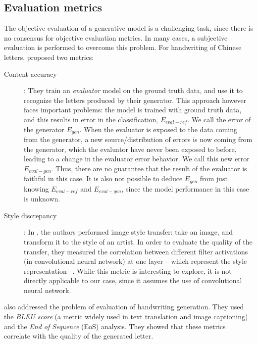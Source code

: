 \documentclass[conference]{IEEEtran}
\begin{document}
\subsection{Evaluation metrics}
\par The objective evaluation of a generative model is a challenging task, since there is no consensus for objective evaluation metrics. In many cases, a subjective evaluation is performed to overcome this problem. For handwriting of Chinese letters, \cite{DBLP:journals/corr/abs-1801-08624} proposed two metrics:
\begin{description}
    \item[Content accuracy] : They train an \textit{evaluator} model on the ground truth data, and use it to recognize the letters produced by their generator. This approach however faces important problems: the model is trained with ground truth data, and this results in error in the classification, $E_{eval-ref}$. We call the error of the generator $E_{gen}$. When the evaluator is exposed to the data coming from the generator, a new source/distribution of errors is now coming from the generator, which the evaluator have never been exposed to before, leading to a change in the evaluator error behavior. We call this new error $E_{eval-gen}$. Thus, there are no guarantee that the result of the evaluator is faithful in this case. It is also not possible to deduce $E_{gen}$ from just knowing $E_{eval-ref}$ and $E_{eval-gen}$, since the model performance in this case is unknown. 
    \item[Style discrepancy] : In \cite{DBLP:journals/corr/GatysEB15a}, the authors performed image style transfer: take an image, and transform it to the style of an artist. In order to evaluate the quality of the transfer, they measured the correlation between different filter activations (in convolutional neural network) at one layer -- which represent the style representation --. While this metric is interesting to explore, it is not directly applicable to our case, since it assumes the use of convolutional neural network.
\end{description}

\par \cite{mohammed2018DTL} also addressed the problem of evaluation of handwriting generation. They used the \textit{BLEU score} \cite{papineni2002bleu} (a metric widely used in text translation and image captioning) and the \textit{End of Sequence} (EoS) analysis. They showed that these metrics correlate with the quality of the generated letter.
\end{document}
